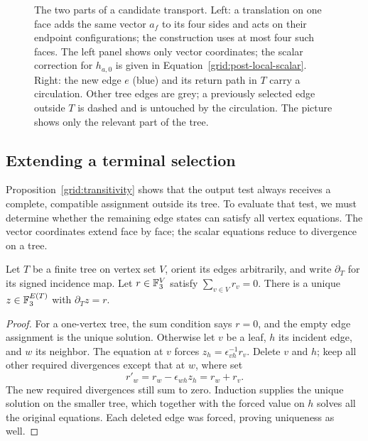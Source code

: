 \begin{figure}[tb]
 \centering
 
 \caption{The two parts of a candidate transport.  Left: a translation
 on one face adds the same vector $a_f$ to its four sides and acts on
 their endpoint configurations; the construction uses at most four
 such faces.  The left panel shows only vector coordinates; the scalar
 correction for $h_{a,0}$ is given in
 Equation~\eqref{grid:post-local-scalar}.  Right: the new edge $e$ (blue)
 and its return path in $T$ carry a circulation.  Other tree edges are grey; a previously
 selected edge outside $T$ is dashed and is untouched by the
 circulation.  The picture shows only the relevant part of the tree.}
 \label{grid:figure}
\end{figure}

\subsection{Extending a terminal selection}

Proposition~\ref{grid:transitivity} shows that the output test always
receives a complete, compatible assignment outside its tree.  To
evaluate that test, we must determine whether the remaining edge
states can satisfy all vertex equations.  The vector coordinates
extend face by face; the scalar equations reduce to divergence on a
tree.

\begin{lemma}\label{grid:tree-divergence}
Let $T$ be a finite tree on vertex set $V$, orient its edges arbitrarily,
and write $\partial_T$ for its signed incidence map.  Let $r\in\mathbb F_3^V$
satisfy $\sum_{v\in V}r_v=0$.  There is a unique
$z\in\mathbb F_3^{E(T)}$ with $\partial_T z=r$.
\end{lemma}
\begin{proof}
For a one-vertex tree, the sum condition says $r=0$, and the empty edge
assignment is the unique solution.  Otherwise let $v$ be a leaf, $h$
its incident edge, and $w$ its neighbor.  The equation at $v$ forces
$z_h=\epsilon_{vh}^{-1}r_v$.  Delete $v$ and $h$; keep all other
required divergences except that at $w$, where set
\[
 r'_w=r_w-\epsilon_{wh}z_h=r_w+r_v.
\]
The new required divergences still sum to zero.  Induction supplies
the unique solution on the smaller tree, which together with the
forced value on $h$ solves all the original equations.  Each deleted
edge was forced, proving uniqueness as well.
\end{proof}

